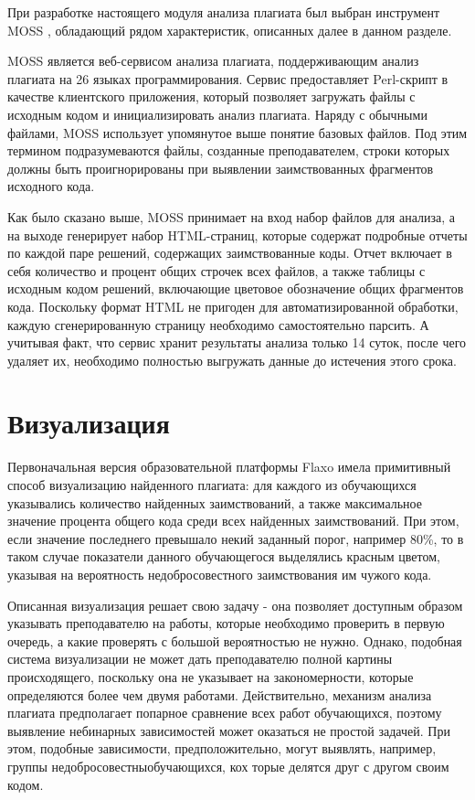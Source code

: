 \documentclass{article}
\begin{document}
При разработке настоящего модуля анализа плагиата был выбран инструмент MOSS \citep{mossOriginalPaper}, обладающий рядом характеристик, описанных далее в данном разделе.

MOSS является веб-сервисом анализа плагиата, поддерживающим анализ плагиата на 26 языках программирования. Сервис предоставляет Perl-скрипт в качестве клиентского приложения, который позволяет загружать файлы с исходным кодом и инициализировать анализ плагиата. Наряду с обычными файлами, MOSS использует упомянутое выше понятие базовых файлов. Под этим термином подразумеваются файлы, созданные преподавателем, строки которых должны быть проигнорированы при выявлении заимствованных фрагментов исходного кода.

Как было сказано выше, MOSS принимает на вход набор файлов для анализа, а на выходе генерирует набор HTML-страниц, которые содержат подробные отчеты по каждой паре решений, содержащих заимствованные коды. Отчет включает в себя количество и процент общих строчек всех файлов, а также таблицы с исходным кодом решений, включающие цветовое обозначение общих фрагментов кода. Поскольку формат HTML не пригоден для автоматизированной обработки, каждую сгенерированную страницу необходимо самостоятельно парсить. А учитывая факт, что сервис хранит результаты анализа только 14 суток, после чего удаляет их, необходимо полностью выгружать данные до истечения этого срока.

\section{Визуализация}

Первоначальная версия образовательной платформы Flaxo имела примитивный способ визуализацию найденного плагиата: для каждого из обучающихся указывались количество найденных заимствований, а также максимальное значение процента общего кода среди всех найденных заимствований. При этом, если значение последнего превышало некий заданный порог, например 80\%, то в таком случае показатели данного обучающегося выделялись красным цветом, указывая на вероятность недобросовестного заимствования им чужого кода.

Описанная визуализация решает свою задачу - она позволяет доступным образом указывать преподавателю на работы, которые необходимо проверить в первую очередь, а какие проверять с большой вероятностью не нужно. Однако, подобная система визуализации не может дать преподавателю полной картины происходящего, поскольку она не указывает на закономерности, которые определяются более чем двумя работами. Действительно, механизм анализа плагиата предполагает попарное сравнение всех работ обучающихся, поэтому выявление небинарных зависимостей может оказаться не простой задачей. При этом, подобные зависимости, предположительно, могут выявлять, например, группы недобросовестныобучающихся, кох торые делятся друг с другом своим кодом.
\end{document}
